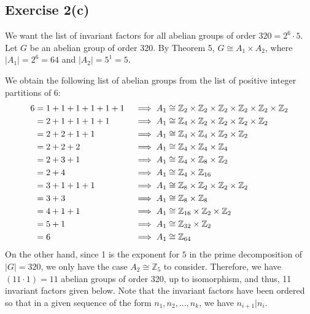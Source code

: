 \subsection*{Exercise 2(c)}
We want the list of invariant factors for all abelian groups of order $320 = 2^6\cdot5$. Let $G$ be an abelian group of order 320. By Theorem 5, $G \cong A_1 \times A_2$, where $|A_1| = 2^6 = 64$ and $|A_2| = 5^1 = 5$.

We obtain the following list of abelian groups from the list of positive integer partitions of 6:
\begin{align}
\setcounter{equation}{0}
    6 &= 1+1+1+1+1+1 &&\implies A_1 \cong \mathbb{Z}_2 \times \mathbb{Z}_2 \times \mathbb{Z}_2 \times \mathbb{Z}_2 \times \mathbb{Z}_2 \times \mathbb{Z}_2 \\
    &= 2+1+1+1+1 &&\implies A_1 \cong \mathbb{Z}_4 \times \mathbb{Z}_2 \times \mathbb{Z}_2 \times \mathbb{Z}_2 \times \mathbb{Z}_2 \\
    &= 2+2+1+1 &&\implies A_1 \cong \mathbb{Z}_4 \times \mathbb{Z}_4 \times \mathbb{Z}_2 \times \mathbb{Z}_2 \\
    &= 2+2+2 &&\implies A_1 \cong \mathbb{Z}_4 \times \mathbb{Z}_4 \times \mathbb{Z}_4 \\
    &= 2+3+1 &&\implies A_1 \cong \mathbb{Z}_4 \times \mathbb{Z}_8 \times \mathbb{Z}_2 \\
    &= 2+4 &&\implies A_1 \cong \mathbb{Z}_4 \times \mathbb{Z}_{16} \\
    &= 3+1+1+1 &&\implies A_1 \cong \mathbb{Z}_8 \times \mathbb{Z}_2 \times \mathbb{Z}_2 \times \mathbb{Z}_2 \\
    &= 3+3 &&\implies A_1 \cong \mathbb{Z}_8 \times \mathbb{Z}_8 \\
    &= 4+1+1 &&\implies A_1 \cong \mathbb{Z}_{16} \times \mathbb{Z}_2 \times \mathbb{Z}_2 \\
    &= 5+1 &&\implies A_1 \cong \mathbb{Z}_{32} \times \mathbb{Z}_2 \\
    &= 6 &&\implies A_1 \cong \mathbb{Z}_{64}
\end{align}
On the other hand, since 1 is the exponent for $5$ in the prime decomposition of $|G| = 320$, we only have the case $A_2 \cong \mathbb{Z}_5$ to consider. Therefore, we have $(11 \cdot 1) = 11$ abelian groups of order 320, up to isomorphism, and thus, 11 invariant factors given below. Note that the invariant factors have been ordered so that in a given sequence of the form $n_1, n_2,..., n_k$, we have $n_{i+1} | n_{i}$. 
